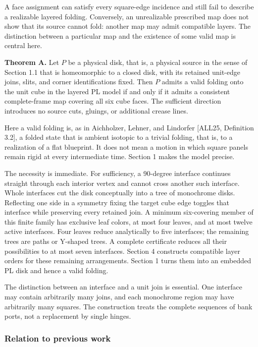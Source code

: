 \documentclass[
  11pt,
]{article}
\begin{document}
A face assignment can satisfy every square-edge incidence and still fail
to describe a realizable layered folding. Conversely, an unrealizable
prescribed map does not show that its source cannot fold: another map
may admit compatible layers. The distinction between a particular map
and the existence of some valid map is central here.

\textbf{Theorem A.} Let \(P\) be a physical disk, that is, a physical
source in the sense of Section 1.1 that is homeomorphic to a closed
disk, with its retained unit-edge joins, slits, and corner
identifications fixed. Then \(P\) admits a valid folding onto the unit
cube in the layered PL model if and only if it admits a consistent
complete-frame map covering all six cube faces. The sufficient direction
introduces no source cuts, gluings, or additional crease lines.

Here a valid folding is, as in Aichholzer, Lehner, and Lindorfer
{[}ALL25, Definition 3.2{]}, a folded state that is ambient isotopic to
a trivial folding, that is, to a realization of a flat blueprint. It
does not mean a motion in which square panels remain rigid at every
intermediate time. Section 1 makes the model precise.

The necessity is immediate. For sufficiency, a 90-degree interface
continues straight through each interior vertex and cannot cross another
such interface. Whole interfaces cut the disk conceptually into a tree
of monochrome disks. Reflecting one side in a symmetry fixing the target
cube edge toggles that interface while preserving every retained join. A
minimum six-covering member of this finite family has exclusive leaf
colors, at most four leaves, and at most twelve active interfaces. Four
leaves reduce analytically to five interfaces; the remaining trees are
paths or Y-shaped trees. A complete certificate reduces all their
possibilities to at most seven interfaces. Section 4 constructs
compatible layer orders for these remaining arrangements. Section 1
turns them into an embedded PL disk and hence a valid folding.

The distinction between an interface and a unit join is essential. One
interface may contain arbitrarily many joins, and each monochrome region
may have arbitrarily many squares. The construction treats the complete
sequences of bank ports, not a replacement by single hinges.

\subsubsection{Relation to previous
work}\label{relation-to-previous-work}
\end{document}
